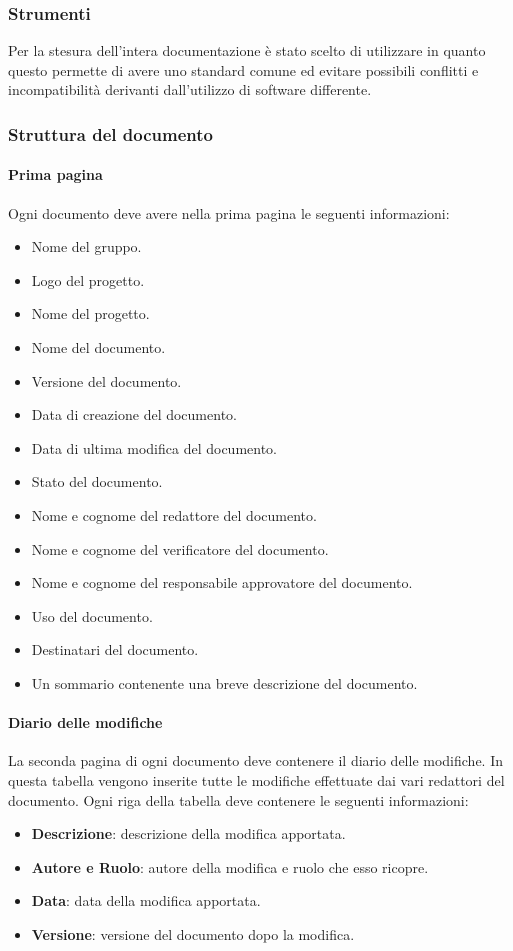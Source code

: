 \subsubsection{Strumenti}
Per la stesura dell'intera documentazione è stato scelto di utilizzare \textit{} in quanto questo  permette di avere uno
standard comune ed evitare possibili conflitti e incompatibilità derivanti
dall'utilizzo di software differente.

\subsubsection{Struttura del documento}
\paragraph{Prima pagina}
Ogni documento deve avere nella prima pagina le seguenti informazioni:
\begin{itemize}
  \item Nome del gruppo.
  \item Logo del progetto.
  \item Nome del progetto.
  \item Nome del documento.
  \item Versione del documento.
  \item Data di creazione del documento.
  \item Data di ultima modifica del documento.
  \item Stato del documento.
  \item Nome e cognome del redattore del documento.
  \item Nome e cognome del verificatore del documento.
  \item Nome e cognome del responsabile approvatore del documento.
  \item Uso del documento.
  \item Destinatari del documento.
  \item Un sommario contenente una breve descrizione del documento.
\end{itemize}

\paragraph{Diario delle modifiche}
La seconda pagina di ogni documento deve contenere il diario delle modifiche. In questa tabella vengono inserite tutte le modifiche effettuate dai vari redattori del documento. Ogni
riga della tabella deve contenere le seguenti informazioni:
\begin{itemize}
  \item \textbf{Descrizione}: descrizione della modifica apportata.
  \item \textbf{Autore e Ruolo}: autore della modifica e ruolo che esso ricopre.
  \item \textbf{Data}: data della modifica apportata.
  \item \textbf{Versione}: versione del documento dopo la modifica.
\end{itemize}

